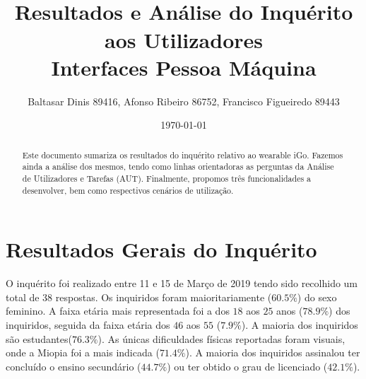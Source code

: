 \documentclass[a4paper]{article}
\title{\igo\\Resultados e Análise do Inquérito aos Utilizadores\\\small Interfaces Pessoa Máquina}
\author{Baltasar Dinis 89416, Afonso Ribeiro 86752, Francisco Figueiredo 89443}
\date{\today}
\begin{document}
\maketitle

\begin{abstract}
  Este documento sumariza os resultados do inquérito relativo ao
  wearable iGo. Fazemos ainda a análise dos mesmos, tendo como linhas
  orientadoras as perguntas da Análise de Utilizadores e Tarefas (AUT).
  Finalmente, propomos três funcionalidades a desenvolver, bem como respectivos cenários de utilização.
\end{abstract}

  \section{Resultados Gerais do Inquérito}
  O inquérito foi realizado entre 11 e 15 de Março de 2019 tendo sido recolhido um
  total de 38 respostas.  Os inquiridos foram maioritariamente ($60.5\%$) do sexo
  feminino. A faixa etária mais representada foi a dos $18$ aos $25$ anos ($78.9\%$) dos
  inquiridos, seguida da faixa etária dos $46$ aos $55$ ($7.9\%$).
  A maioria dos inquiridos são estudantes($76.3\%$). As únicas dificuldades físicas
  reportadas foram visuais, onde a Miopia foi a mais indicada ($71.4\%$). A
  maioria dos inquiridos assinalou ter concluído o ensino secundário ($44.7\%$) ou
  ter obtido o grau de licenciado ($42.1\%$).
\end{document}
